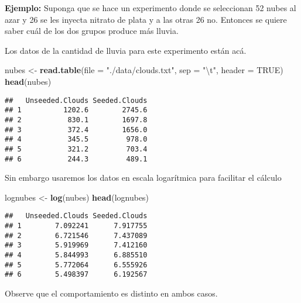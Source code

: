 \documentclass[
  12pt,
]{book}
\newenvironment{Shaded}{\begin{snugshade}}{\end{snugshade}}
\newcommand{\CharTok}[1]{\textcolor[rgb]{0.31,0.60,0.02}{#1}}
\newcommand{\DataTypeTok}[1]{\textcolor[rgb]{0.13,0.29,0.53}{#1}}
\newcommand{\KeywordTok}[1]{\textcolor[rgb]{0.13,0.29,0.53}{\textbf{#1}}}
\newcommand{\NormalTok}[1]{#1}
\newcommand{\OtherTok}[1]{\textcolor[rgb]{0.56,0.35,0.01}{#1}}
\newcommand{\StringTok}[1]{\textcolor[rgb]{0.31,0.60,0.02}{#1}}
\begin{document}
\textbf{Ejemplo:} Suponga que se hace un experimento donde se seleccionan 52 nubes al
azar y 26 se les inyecta nitrato de plata y a las otras 26 no. Entonces se
quiere saber cuál de los dos grupos produce más lluvia.

Los datos de la cantidad de lluvia para este experimento están acá.

\begin{Shaded}
\begin{Highlighting}[]
\NormalTok{nubes \textless{}{-}}\StringTok{ }\KeywordTok{read.table}\NormalTok{(}\DataTypeTok{file =} \StringTok{"./data/clouds.txt"}\NormalTok{, }\DataTypeTok{sep =} \StringTok{"}\CharTok{\textbackslash{}t}\StringTok{"}\NormalTok{, }\DataTypeTok{header =} \OtherTok{TRUE}\NormalTok{)}
\KeywordTok{head}\NormalTok{(nubes)}
\end{Highlighting}
\end{Shaded}

\begin{verbatim}
##   Unseeded.Clouds Seeded.Clouds
## 1          1202.6        2745.6
## 2           830.1        1697.8
## 3           372.4        1656.0
## 4           345.5         978.0
## 5           321.2         703.4
## 6           244.3         489.1
\end{verbatim}

Sin embargo usaremos los datos en escala logarítmica para facilitar el cálculo

\begin{Shaded}
\begin{Highlighting}[]
\NormalTok{lognubes \textless{}{-}}\StringTok{ }\KeywordTok{log}\NormalTok{(nubes)}
\KeywordTok{head}\NormalTok{(lognubes)}
\end{Highlighting}
\end{Shaded}

\begin{verbatim}
##   Unseeded.Clouds Seeded.Clouds
## 1        7.092241      7.917755
## 2        6.721546      7.437089
## 3        5.919969      7.412160
## 4        5.844993      6.885510
## 5        5.772064      6.555926
## 6        5.498397      6.192567
\end{verbatim}

Observe que el comportamiento es distinto en ambos casos.
\end{document}
